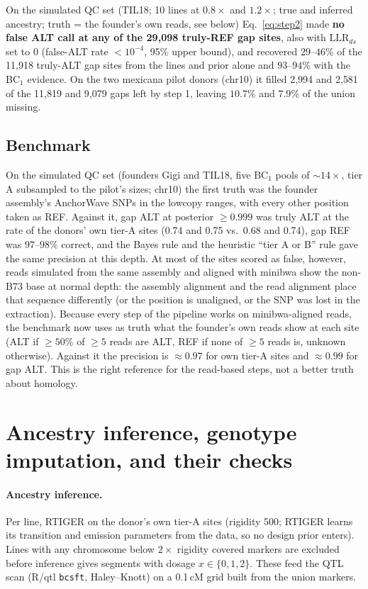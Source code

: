 \documentclass[11pt]{article}
\newcommand{\LLR}{\mathrm{LLR}}
\newcommand{\code}[1]{\texttt{#1}}
\begin{document}
On the simulated QC set (TIL18; 10 lines at $0.8\times$ and $1.2\times$; true and inferred ancestry; truth = the founder's own reads, see
below) Eq.~\eqref{eq:step2} made \textbf{no false ALT call at any of the 29{,}098 truly-REF gap sites}, also with $\LLR_{ds}$ set to 0
(false-ALT rate $<10^{-4}$, 95\% upper bound), and recovered $29$--$46\%$ of the 11{,}918 truly-ALT gap sites from the lines and prior
alone and $93$--$94\%$ with the BC$_1$ evidence. On the two mexicana pilot donors (chr10) it filled 2{,}994 and 2{,}581 of the 11{,}819
and 9{,}079 gaps left by step 1, leaving $10.7\%$ and $7.9\%$ of the union missing.

\subsection{Benchmark}
On the simulated QC set (founders Gigi and TIL18, five BC$_1$ pools of $\sim14\times$, tier A subsampled to the pilot's sizes; chr10) the
first truth was the founder assembly's AnchorWave SNPs in the lowcopy ranges, with every other position taken as REF. Against it, gap ALT
at posterior $\ge0.999$ was truly ALT at the rate of the donors' own tier-A sites (0.74 and 0.75 vs.\ 0.68 and 0.74), gap REF was
$97$--$98\%$ correct, and the Bayes rule and the heuristic ``tier A or B'' rule gave the same precision at this depth. At most of the sites
scored as false, however, reads simulated from the same assembly and aligned with minibwa show the non-B73 base at normal depth: the
assembly alignment and the read alignment place that sequence differently (or the position is unaligned, or the SNP was lost in the
extraction). Because every step of the pipeline works on minibwa-aligned reads, the benchmark now uses as truth what the founder's own
reads show at each site (ALT if $\ge50\%$ of $\ge5$ reads are ALT, REF if none of $\ge5$ reads is, unknown otherwise). Against it the
precision is $\approx0.97$ for own tier-A sites and $\approx0.99$ for gap ALT. This is the right reference for the read-based steps, not a
better truth about homology.

\section{Ancestry inference, genotype imputation, and their checks}
\label{sec:checks}

\paragraph{Ancestry inference.} Per line, RTIGER \citep{campos2023rtiger} on the donor's own tier-A sites (rigidity 500; RTIGER learns its transition and emission parameters from the data, so no design prior enters). Lines with any chromosome below $2\times$ rigidity covered markers are excluded before inference
gives segments with dosage $x\in\{0,1,2\}$. These feed the QTL scan (R/qtl \code{bcsft}, Haley--Knott) on a 0.1\,cM grid built from the
union markers.
\end{document}
